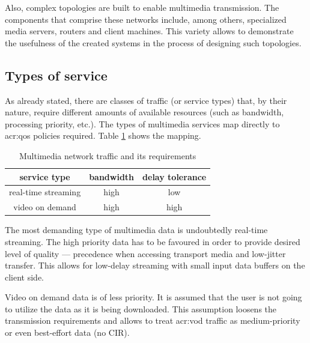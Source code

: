 \documentclass[11pt]{book}
\begin{document}
      Also, complex topologies are built to enable multimedia transmission. The components that comprise these networks
      include, among others, specialized media servers, routers and client machines. This variety allows to demonstrate
      the usefulness of the created systems in the process of designing such topologies.


      \subsection{Types of service}
      
        As already stated, there are classes of traffic (or service types) that, by their nature, require different
        amounts of available resources (such as bandwidth, processing priority, etc.). The types of multimedia services
        map directly to \gls{acr:qos} policies required. Table \ref{tab:uc:qos} shows the mapping.

        \begin{table}[H]
          \begin{center}
            \begin{tabular}{|c|c|c|}
              \hline
              service type        & bandwidth & delay tolerance \\
              \hline \hline
              real-time streaming & high      & low \\
              \hline
              video on demand     & high      & high  \\
              \hline
            \end{tabular}
          \end{center}


          \caption{Multimedia network traffic and its requirements}
          \label{tab:uc:qos}
        \end{table}

        The most demanding type of multimedia data is undoubtedly real-time streaming. The high priority data has to be
        favoured in order to provide desired level of quality --- precedence when accessing transport media and
        low-jitter transfer. This allows for low-delay streaming with small input data buffers on the client side.

        Video on demand data is of less priority. It is assumed that the user is not going to utilize the data as it is
        being downloaded. This assumption loosens the transmission requirements and allows to treat \gls{acr:vod} traffic as
        medium-priority or even best-effort data (no CIR).
\end{document}
